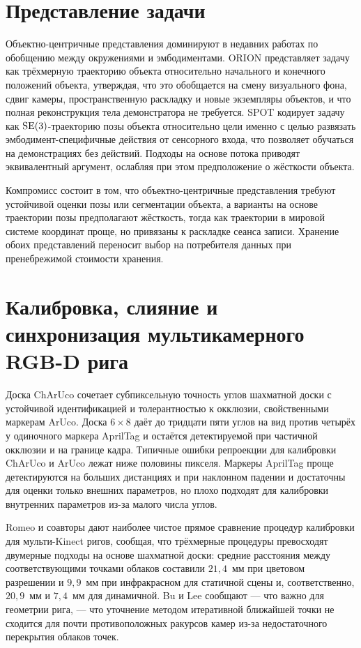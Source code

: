\documentclass[12pt, a4paper, oneside]{report}
\begin{document}
\section{Представление задачи}

Объектно-центричные представления доминируют в недавних работах по обобщению
между окружениями и эмбодиментами. ORION представляет задачу как трёхмерную
траекторию объекта относительно начального и конечного положений объекта,
утверждая, что это обобщается на смену визуального фона, сдвиг камеры,
пространственную раскладку и новые экземпляры объектов, и что полная
реконструкция тела демонстратора не требуется. SPOT кодирует задачу как
$\mathrm{SE}(3)$-траекторию позы объекта относительно цели именно с целью развязать
эмбодимент-специфичные действия от сенсорного входа, что позволяет обучаться на
демонстрациях без действий. Подходы на основе потока приводят эквивалентный
аргумент, ослабляя при этом предположение о жёсткости объекта.

Компромисс состоит в том, что объектно-центричные представления требуют
устойчивой оценки позы или сегментации объекта, а варианты на основе траектории
позы предполагают жёсткость, тогда как траектории в мировой системе координат
проще, но привязаны к раскладке сеанса записи. Хранение обоих представлений
переносит выбор на потребителя данных при пренебрежимой стоимости хранения.

\section{Калибровка, слияние и синхронизация мультикамерного RGB-D рига}

Доска ChArUco сочетает субпиксельную точность углов шахматной доски с
устойчивой идентификацией и толерантностью к окклюзии, свойственными маркерам
ArUco. Доска $6\times8$ даёт до тридцати пяти углов на вид против четырёх у
одиночного маркера AprilTag и остаётся детектируемой при частичной окклюзии и на
границе кадра. Типичные ошибки репроекции для калибровки ChArUco и ArUco лежат
ниже половины пикселя. Маркеры AprilTag проще детектируются на больших
дистанциях и при наклонном падении и достаточны для оценки только внешних
параметров, но плохо подходят для калибровки внутренних параметров из-за малого
числа углов.

Romeo и соавторы дают наиболее чистое прямое сравнение процедур калибровки для
мульти-Kinect ригов, сообщая, что трёхмерные процедуры превосходят двумерные
подходы на основе шахматной доски: средние расстояния между соответствующими
точками облаков составили $21{,}4$~мм при цветовом разрешении и $9{,}9$~мм при
инфракрасном для статичной сцены и, соответственно, $20{,}9$~мм и $7{,}4$~мм для
динамичной. Bu и Lee сообщают --- что важно для геометрии рига, --- что
уточнение методом итеративной ближайшей точки не сходится для почти
противоположных ракурсов камер из-за недостаточного перекрытия облаков точек.
\end{document}
